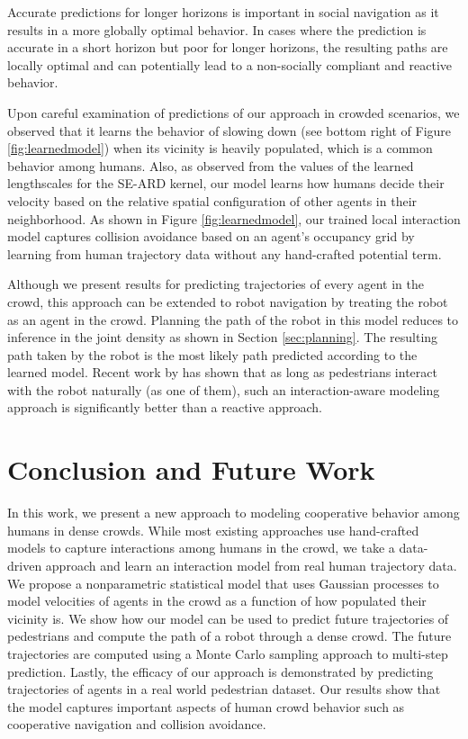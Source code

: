 Accurate predictions for longer horizons is important in social navigation
as it results in a more globally optimal behavior. In cases where the
prediction is accurate in a short horizon but poor for longer horizons,
the resulting paths are locally optimal and can potentially lead to a
non-socially compliant and reactive behavior.

Upon careful examination of predictions of our approach in crowded
scenarios, we observed that it learns the behavior of slowing down
(see bottom right of Figure \ref{fig:learnedmodel}) when its vicinity
is heavily populated, which is a common behavior among humans. Also,
as observed from the values of the learned lengthscales for the SE-ARD
kernel, our model learns how humans decide their velocity based on the
relative spatial configuration of other agents in their
neighborhood. As shown in Figure \ref{fig:learnedmodel}, our trained
local interaction model captures collision avoidance based on an
agent's occupancy grid by learning from human trajectory data without
any hand-crafted potential term.

Although we present results for predicting trajectories of every
agent in the crowd, this approach can be extended to robot navigation by
treating the robot as an agent in the crowd. Planning the path of the
robot in this model reduces to inference in the joint density as shown
in Section \ref{sec:planning}. The resulting path taken by the robot
is the most likely path predicted according to the learned
model. Recent work by \cite{pfeiffer16} has shown that as long as
pedestrians interact with the robot naturally (as one of them), such
an interaction-aware modeling approach is significantly better than a
reactive approach.


\section{Conclusion and Future Work}
\label{sec:conclusion}

In this work, we present a new approach to modeling cooperative
behavior among humans in dense crowds. While most existing approaches
use hand-crafted models to capture interactions among humans in the
crowd, we take a data-driven approach and learn an interaction model
from real human trajectory data. We propose a nonparametric
statistical model that uses Gaussian processes to model velocities of
agents in the crowd as a function of how populated their vicinity
is. We show how our model can be used to predict future trajectories
of pedestrians and compute the path of a robot through a dense
crowd. The future trajectories are computed using a Monte Carlo
sampling approach to multi-step prediction. Lastly, the efficacy of
our approach is demonstrated by predicting trajectories of agents in a
real world pedestrian dataset. Our results show that the model
captures important aspects of human crowd behavior such as cooperative
navigation and collision avoidance.

